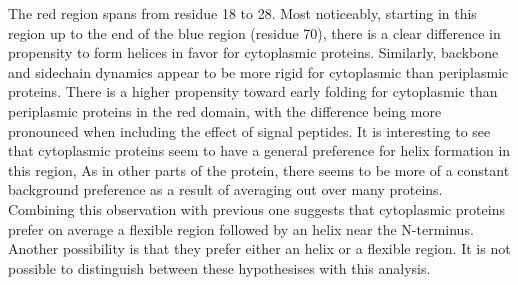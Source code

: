 The red region spans from residue 18 to 28.
Most noticeably, starting in this region up to the end of the blue region (residue 70),
there is a clear difference in propensity to form helices in favor for cytoplasmic proteins.
Similarly, backbone and sidechain dynamics appear to be more rigid for cytoplasmic than periplasmic proteins.
There is a higher propensity toward early folding for cytoplasmic than periplasmic proteins in the red domain,
with the difference being more pronounced when including the effect of signal peptides.
It is interesting to see that cytoplasmic proteins seem to have a general preference for helix formation in this region,
As in other parts of the protein, there seems to be more of a constant background preference as a result of averaging out over many proteins.
Combining this observation with previous one suggests that cytoplasmic proteins prefer on average a flexible region followed by an helix near the N-terminus.
Another possibility is that they prefer either an helix or a flexible region.
It is not possible to distinguish between these hypothesises with this analysis.
